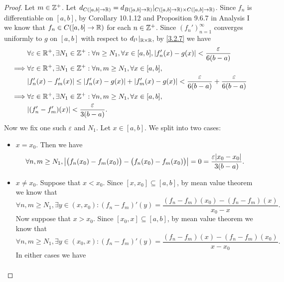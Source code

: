 \begin{proof}
  Let \(m \in \mathbb{Z}^+\).
  Let \(d_{C([a, b] \to \mathbb{R})} = d_{B([a, b] \to \mathbb{R})}|_{C([a, b] \to \mathbb{R}) \times C([a, b] \to \mathbb{R})}\).
  Since \(f_n\) is differentiable on \([a, b]\), by Corollary 10.1.12 and Proposition 9.6.7 in Analysis I we know that \(f_n \in C([a, b] \to \mathbb{R})\) for each \(n \in \mathbb{Z}^+\).
  Since \((f_n')_{n = 1}^\infty\) converges uniformly to \(g\) on \([a, b]\) with respect to \(d_{l^1}|_{\mathbb{R} \times \mathbb{R}}\), by \cref{3.2.7} we have
  \begin{align*}
             & \forall \varepsilon \in \R^+, \exists N_1 \in \Z^+ : \forall n \geq N_1, \forall x \in [a, b], \abs{f_n'(x) - g(x)} < \dfrac{\varepsilon}{6(b - a)} \\
    \implies & \forall \varepsilon \in \R^+, \exists N_1 \in \Z^+ : \forall n, m \geq N_1, \forall x \in [a, b],                                                   \\
             & \abs{f_n'(x) - f_m'(x)} \leq \abs{f_n'(x) - g(x)} + \abs{f_m'(x) - g(x)} < \dfrac{\varepsilon}{6(b - a)} + \dfrac{\varepsilon}{6(b - a)}            \\
    \implies & \forall \varepsilon \in \R^+, \exists N_1 \in \Z^+ : \forall n, m \geq N_1, \forall x \in [a, b],                                                   \\
             & \abs{(f_n' - f_m')(x)} < \dfrac{\varepsilon}{3(b - a)}.
  \end{align*}
  Now we fix one such \(\varepsilon\) and \(N_1\).
  Let \(x \in [a, b]\).
  We split into two cases:
  \begin{itemize}
    \item \(x = x_0\).
          Then we have
          \[
            \forall n, m \geq N_1, \abs{\big(f_n(x_0) - f_m(x_0)\big) - \big(f_n(x_0) - f_m(x_0)\big)} = 0 = \dfrac{\varepsilon \abs{x_0 - x_0}}{3(b - a)}.
          \]
    \item \(x \neq x_0\).
          Suppose that \(x < x_0\).
          Since \([x, x_0] \subseteq [a, b]\), by mean value theorem we know that
          \[
            \forall n, m \geq N_1, \exists y \in (x, x_0) : (f_n - f_m)'(y) = \dfrac{(f_n - f_m)(x_0) - (f_n - f_m)(x)}{x_0 - x}.
          \]
          Now suppose that \(x > x_0\).
          Since \([x_0, x] \subseteq [a, b]\), by mean value theorem we know that
          \[
            \forall n, m \geq N_1, \exists y \in (x_0, x) : (f_n - f_m)'(y) = \dfrac{(f_n - f_m)(x) - (f_n - f_m)(x_0)}{x - x_0}.
          \]
          In either cases we have
          \begin{align*}

\end{align*}
\end{itemize}
\end{proof}
